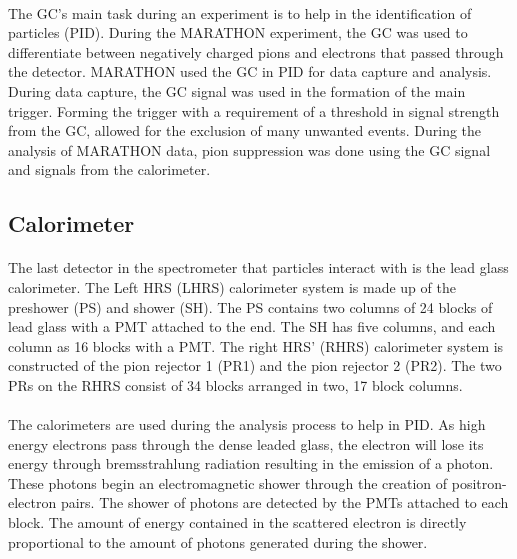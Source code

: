 	\paragraph{}The GC's main task during an experiment is to help in the identification of particles (PID). During the MARATHON experiment, the GC was used to differentiate between negatively charged pions and electrons that passed through the detector. MARATHON used the GC in PID for data capture and analysis. During data capture, the GC signal was used in the formation of the main trigger. Forming the trigger with a requirement of a threshold in signal strength from the GC, allowed for the exclusion of many unwanted events. During the analysis of MARATHON data, pion suppression was done using the GC signal and signals from the calorimeter.   
	\subsection{Calorimeter}\label{sec:Cal}
	\paragraph{}The last detector in the spectrometer that particles interact with is the lead glass calorimeter. The Left HRS (LHRS) calorimeter system is made up of the preshower (PS) and shower (SH). The PS contains two columns of 24 blocks of lead glass with a PMT attached to the end. The SH has five columns, and each column as 16 blocks with a PMT. The right HRS' (RHRS) calorimeter system is constructed of the pion rejector 1 (PR1) and the pion rejector 2 (PR2). The two PRs on the RHRS consist of 34 blocks arranged in two, 17 block columns. 
	\paragraph{}The calorimeters are used during the analysis process to help in PID. As high energy electrons pass through the dense leaded glass, the electron will lose its energy through bremsstrahlung radiation resulting in the emission of a photon. These photons begin an electromagnetic shower through the creation of positron-electron pairs. The shower of photons are detected by the PMTs attached to each block. The amount of energy contained in the scattered electron is directly proportional to the amount of photons generated during the shower.

